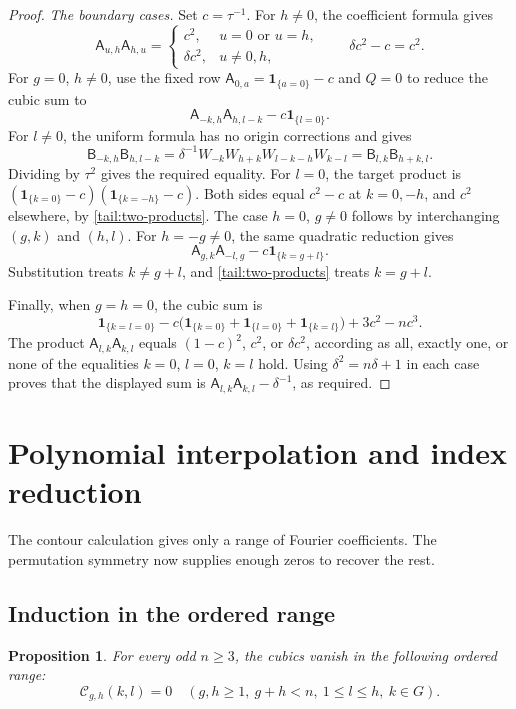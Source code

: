 \documentclass[11pt]{article}
\numberwithin{equation}{section}
\newtheorem{proposition}[theorem]{Proposition}
\theoremstyle{definition}
\theoremstyle{remark}
\newcommand{\ind}[1]{\mathbf1_{\{#1\}}}
\begin{document}
\begin{proof}
\emph{The boundary cases.}
Set $c=\tau^{-1}$. For $h\ne0$, the coefficient formula gives
\begin{equation}\label{tail:two-products}
 \mathsf A_{u,h}\mathsf A_{h,u}=
 \begin{cases}
 c^2,&u=0\text{ or }u=h,\\
 \delta c^2,&u\ne0,h,
 \end{cases}
 \qquad \delta c^2-c=c^2.
\end{equation}
For $g=0$, $h\ne0$, use the fixed row
$\mathsf A_{0,a}=\ind{a=0}-c$ and $Q=0$ to reduce the cubic sum to
\[
 \mathsf A_{-k,h}\mathsf A_{h,l-k}-c\ind{l=0}.
\]
For $l\ne0$, the uniform formula has no origin corrections and gives
\[
 \mathsf B_{-k,h}\mathsf B_{h,l-k}
 =\delta^{-1}W_{-k}W_{h+k}W_{l-k-h}W_{k-l}
 =\mathsf B_{l,k}\mathsf B_{h+k,l}.
\]
Dividing by $\tau^2$ gives the required equality.
For $l=0$, the target product is
$(\ind{k=0}-c)(\ind{k=-h}-c)$.
Both sides equal $c^2-c$ at $k=0,-h$, and $c^2$ elsewhere,
by \eqref{tail:two-products}.
The case $h=0$, $g\ne0$ follows by interchanging $(g,k)$ and $(h,l)$.
For $h=-g\ne0$, the same quadratic reduction gives
\[
 \mathsf A_{g,k}\mathsf A_{-l,g}-c\ind{k=g+l}.
\]
Substitution treats $k\ne g+l$, and \eqref{tail:two-products}
treats $k=g+l$.

Finally, when $g=h=0$, the cubic sum is
\[
 \ind{k=l=0}
 -c\bigl(\ind{k=0}+\ind{l=0}+\ind{k=l}\bigr)
 +3c^2-nc^3.
\]
The product $\mathsf A_{l,k}\mathsf A_{k,l}$ equals
$(1-c)^2$, $c^2$, or $\delta c^2$, according as all, exactly one,
or none of the equalities $k=0$, $l=0$, $k=l$ hold.
Using $\delta^2=n\delta+1$ in each case proves that the displayed
sum is $\mathsf A_{l,k}\mathsf A_{k,l}-\delta^{-1}$, as required.
\end{proof}

\section{Polynomial interpolation and index reduction}
\label{tail:completion}

The contour calculation gives only a range of Fourier coefficients.
The permutation symmetry now supplies enough zeros to recover the rest.

\subsection{Induction in the ordered range}

\begin{proposition}\label{tail:ordered}
For every odd $n\ge3$, the cubics vanish in the following ordered range:
\[
 \mathcal C_{g,h}(k,l)=0\quad
 (g,h\ge1,\ g+h<n,\ 1\le l\le h,\ k\in G).
\]
\end{proposition}
\end{document}
